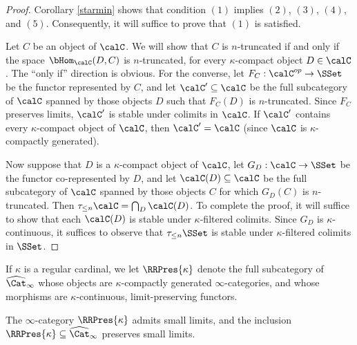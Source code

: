 \begin{proof}
Corollary \ref{starmin} shows that condition $(1)$ implies $(2)$, $(3)$, $(4)$, and $(5)$.
Consequently, it will suffice to prove that $(1)$ is satisfied. 

Let $C$ be an object of $\calC$. We will show that $C$ is $n$-truncated if and only if the space
$\bHom_{\calC}(D, C)$ is $n$-truncated, for every $\kappa$-compact object $D \in \calC$. 
The ``only if'' direction is obvious. For the converse, let $F_{C}: \calC^{op} \rightarrow \SSet$ be the functor represented by $C$, and let $\calC' \subseteq \calC$ be the full subcategory of $\calC$ spanned by those objects $D$ such that $F_{C}(D)$ is $n$-truncated. Since $F_{C}$ preserves limits, $\calC'$ is stable under colimits in $\calC$. If $\calC'$ contains every $\kappa$-compact object of $\calC$, then $\calC' = \calC$ (since $\calC$ is $\kappa$-compactly generated).

Now suppose that $D$ is a $\kappa$-compact object of $\calC$, let
$G_{D}: \calC \rightarrow \SSet$ be the functor co-represented by $D$, and let
$\calC(D) \subseteq \calC$ be the full subcategory of $\calC$ spanned by those objects
$C$ for which $G_{D}(C)$ is $n$-truncated. Then $\tau_{\leq n} \calC = \bigcap_{D} \calC(D)$. To complete the proof, it will suffice to show that each $\calC(D)$ is stable under $\kappa$-filtered colimits. Since $G_{D}$ is $\kappa$-continuous, it suffices to observe that
$\tau_{\leq n} \SSet$ is stable under $\kappa$-filtered colimits in $\SSet$.
\end{proof}


\begin{definition}
If $\kappa$ is a regular cardinal, we let $\RRPres{\kappa}$ denote the full subcategory
of $\widehat{\Cat}_{\infty}$ whose objects are $\kappa$-compactly generated $\infty$-categories, and whose morphisms are $\kappa$-continuous, limit-preserving functors.
\end{definition}

\begin{proposition}\label{cnote}
The $\infty$-category $\RRPres{\kappa}$ admits small limits, and the inclusion
$\RRPres{\kappa} \subseteq \widehat{\Cat}_{\infty}$ preserves small limits.
\end{proposition}

